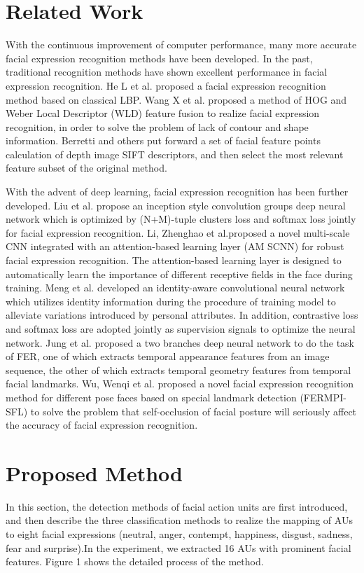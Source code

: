 \documentclass[10pt, conference, compsocconf]{IEEEtran}
\begin{document}
\section{Related Work}

With the continuous improvement of computer performance, many more accurate facial expression recognition methods have been developed. In the past, traditional recognition methods have shown excellent performance in facial expression recognition. He L\cite{He2005An} et al. proposed a facial expression recognition method based on classical LBP. Wang X\cite{Wang2014Feature} et al. proposed a method of HOG and Weber Local Descriptor (WLD) feature fusion to realize facial expression recognition, in order to solve the problem of lack of contour and shape information. Berretti\cite{Berretti2010A} and others put forward a set of facial feature points calculation of depth image SIFT descriptors, and then select the most relevant feature subset of the original method.

With the advent of deep learning, facial expression recognition has been further developed. Liu\cite{Liu2017Adaptive} et al. propose an inception style convolution groups deep neural network which is optimized by (N+M)-tuple clusters loss and softmax loss jointly for facial expression recognition. Li, Zhenghao\cite{li2018facial} et al.proposed a novel multi-scale CNN integrated with an attention-based learning layer (AM SCNN) for robust facial expression recognition. The attention-based learning layer is designed to automatically learn the importance of different receptive fields in the face during training. Meng\cite{Meng2017Identity} et al. developed an identity-aware convolutional neural network which utilizes identity information during the procedure of training model to alleviate variations introduced by personal attributes. In addition, contrastive loss and softmax loss are adopted jointly as supervision signals to optimize the neural network. Jung\cite{Jung2015Joint} et al. proposed a two branches deep neural network to do the task of FER, one of which extracts temporal appearance features from an image sequence, the other of which extracts temporal geometry features from temporal facial landmarks. Wu, Wenqi\cite{wu2018facial} et al. proposed a novel facial expression recognition method for different pose faces based on special landmark detection (FERMPI-SFL) to solve the problem that self-occlusion of facial posture will seriously affect the accuracy of facial expression recognition. 

\section{Proposed Method}
In this section, the detection methods of facial action units are first introduced, and then describe the three classification methods to realize the mapping of AUs to eight facial expressions (neutral, anger, contempt, happiness, disgust, sadness, fear and surprise).In the experiment, we extracted 16 AUs with prominent facial features. Figure 1 shows the detailed process of the method.
\end{document}
